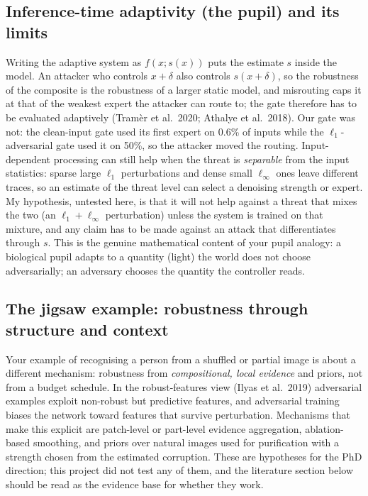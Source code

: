 \documentclass[11pt]{article}
\begin{document}
\subsection{Inference-time adaptivity (the pupil) and its limits}
Writing the adaptive system as $f(x;s(x))$ puts the estimate $s$ inside the model. An attacker who controls $x{+}\delta$ also controls $s(x{+}\delta)$, so the robustness of the composite is the robustness of a larger static model, and misrouting caps it at that of the weakest expert the attacker can route to; the gate therefore has to be evaluated adaptively (Tram\`er et al.\ 2020; Athalye et al.\ 2018). Our gate was not: the clean-input gate used its first expert on 0.6\% of inputs while the $\ell_1$-adversarial gate used it on 50\%, so the attacker moved the routing.
Input-dependent processing can still help when the threat is \emph{separable} from the input statistics: sparse large $\ell_1$ perturbations and dense small $\ell_\infty$ ones leave different traces, so an estimate of the threat level can select a denoising strength or expert. My hypothesis, untested here, is that it will not help against a threat that mixes the two (an $\ell_1{+}\ell_\infty$ perturbation) unless the system is trained on that mixture, and any claim has to be made against an attack that differentiates through $s$.
This is the genuine mathematical content of your pupil analogy: a biological pupil adapts to a quantity (light) the world does not choose adversarially; an adversary chooses the quantity the controller reads.

\subsection{The jigsaw example: robustness through structure and context}
Your example of recognising a person from a shuffled or partial image is about a different mechanism: robustness from \emph{compositional, local evidence} and priors, not from a budget schedule. In the robust-features view (Ilyas et al.\ 2019) adversarial examples exploit non-robust but predictive features, and adversarial training biases the network toward features that survive perturbation.
Mechanisms that make this explicit are patch-level or part-level evidence aggregation, ablation-based smoothing, and priors over natural images used for purification with a strength chosen from the estimated corruption. These are hypotheses for the PhD direction; this project did not test any of them, and the literature section below should be read as the evidence base for whether they work.
\end{document}
